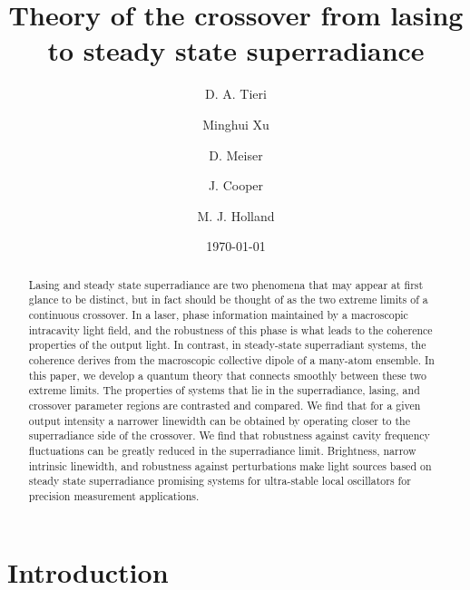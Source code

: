 \documentclass[aps,
twocolumn,
showpacs,
superscriptaddress,groupedaddress]{revtex4}
\begin{document}
\title{Theory of the crossover from lasing to steady state superradiance}
\author{D. A. Tieri}
\author{Minghui Xu}
\author{D. Meiser}
\author{J. Cooper}
\author{M. J. Holland}
\date{\today}

\begin{abstract}
  Lasing and steady state superradiance are two phenomena that may
  appear at first glance to be distinct, but in fact should be thought
  of as the two extreme limits of a continuous crossover.  In a laser,
  phase information maintained by a macroscopic intracavity light field,
  and the robustness of this phase is what leads to the coherence
  properties of the output light.  In contrast, in steady-state
  superradiant systems, the coherence derives from the macroscopic
  collective dipole of a many-atom ensemble.  In this paper, we develop
  a quantum theory that connects smoothly between these two extreme
  limits.  The properties of systems that lie in the superradiance,
  lasing, and crossover parameter regions are contrasted and compared.
  We find that for a given output intensity a narrower linewidth can be
  obtained by operating closer to the superradiance side of the
  crossover.  We find that robustness against cavity frequency
  fluctuations can be greatly reduced in the superradiance limit.
  Brightness, narrow intrinsic linewidth, and robustness against
  perturbations make light sources based on steady state superradiance
  promising systems for ultra-stable local oscillators for precision
  measurement applications.
\end{abstract}



\maketitle

\section{Introduction}
\end{document}

